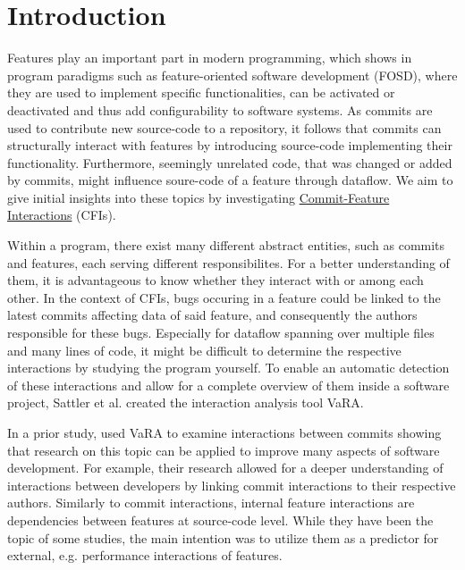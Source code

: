 \chapter{Introduction}\label{ch:introduction}

Features play an important part in modern programming, which shows in program paradigms such as feature-oriented software development (FOSD),
where they are used to implement specific functionalities, can be activated or deactivated and thus add configurability to software systems.
As commits are used to contribute new source-code to a repository, it follows that commits can structurally interact with features by introducing source-code implementing their functionality. 
Furthermore, seemingly unrelated code, that was changed or added by commits, might influence soure-code of a feature through dataflow.
We aim to give initial insights into these topics by investigating \hyperref[ch:example_chapter]{Commit-Feature Interactions} (CFIs).

Within a program, there exist many different abstract entities, such as commits and features, each serving different responsibilites.
For a better understanding of them, it is advantageous to know whether they interact with or among each other.
In the context of CFIs, bugs occuring in a feature could be linked to the latest commits affecting data of said feature, and consequently the authors responsible for these bugs.
Especially for dataflow spanning over multiple files and many lines of code, it might be difficult to determine the respective interactions by studying the program yourself.
To enable an automatic detection of these interactions and allow for a complete overview of them inside a software project, Sattler et al.\cite{sattler2023thesis} created the interaction analysis tool VaRA\cite{VaRA2023}.

In a prior study, \citet{sattler2023seal} used VaRA to examine interactions between commits showing that research on this topic can be applied to improve many aspects of software development.
For example, their research allowed for a deeper understanding of interactions between developers by linking commit interactions to their respective authors\cite{sattler2023seal}. 
Similarly to commit interactions, internal feature interactions are dependencies between features at source-code level. 
While they have been the topic of some studies\cite{kolesnikov2017relation}, the main intention was to utilize them as a predictor for external, e.g. performance interactions\cite{siegmund2012predicting} of features.

